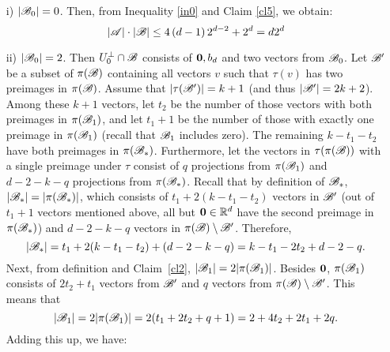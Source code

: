 \begin{enumerate}
\begin{enumerate}
            \begin{enumerate}
                \item[i)] $\left|{\mathscr{B}}_0\right|=0$. Then, from Inequality \ref{in0} and Claim \ref{cl5}, we obtain:
                \begin{equation*}
                    \left|{\mathscr{A}}\right|\cdot\left|{\mathscr{B}}\right|\leq4\left(d-1\right)2^{d-2}+2^d=d 2^d
                \end{equation*}
                \item[ii)] $\left|{\mathscr{B}}_0\right|=2$. Then $U_0^{\bot} \cap {\mathscr{B}}$ consists of $\mathbf{0}, b_d$ and two vectors from ${\mathscr{B}}_0$. Let ${\mathscr{B}}'$ be a subset of $\pi({\mathscr{B}})$ containing all vectors $v$ such that $\tau(v)$ has two preimages in $\pi({\mathscr{B}})$. Assume that $|\tau({\mathscr{B}}')|=k+1$ (and thus $|{\mathscr{B}}'| = 2k+2$).
                Among these $k+1$ vectors, let $t_2$ be the number of those vectors with both preimages in $\pi({\mathscr{B}}_1)$, and let $t_1+1$ be the number of those with exactly one preimage in $\pi({\mathscr{B}}_1)$ (recall that ${\mathscr{B}}_1$ includes zero). The remaining $k-t_1-t_2$ have both preimages in $\pi({\mathscr{B}}_*)$. Furthermore, let the vectors in $\tau(\pi({\mathscr{B}}))$ with a single preimage under $\tau$ consist of $q$ projections from $\pi({\mathscr{B}}_1)$ and $d-2-k-q$ projections from $\pi({\mathscr{B}}_*)$. Recall that by definition of ${\mathscr{B}}_*$, $|{\mathscr{B}}_*| = |\pi({\mathscr{B}}_*)|$, which consists of $t_1 + 2(k-t_1-t_2)$ vectors in ${\mathscr{B}}'$ (out of $t_1 + 1$ vectors mentioned above, all but $\mathbf{0}\in{\mathbb{R}}^d$ have the second preimage in $\pi({\mathscr{B}}_*)$) and $d-2-k-q$ vectors in $\pi({\mathscr{B}})\setminus {\mathscr{B}}'$. Therefore, 
                \[
                    |{\mathscr{B}}_*| = t_1 + 2(k-t_1-t_2) + (d-2-k-q) = k - t_1 - 2t_2 + d - 2 - q.
                \]
                Next, from definition and Claim~\ref{cl2}, $|{\mathscr{B}}_1|=2|\pi({\mathscr{B}}_1)|$. Besides $\mathbf{0}$, $\pi({\mathscr{B}}_1)$ consists of $2t_2+t_1$ vectors from ${\mathscr{B}}'$ and $q$ vectors from $\pi({\mathscr{B}})\setminus {\mathscr{B}}'$. This means that
                \[
                    |{\mathscr{B}}_1| = 2|\pi({\mathscr{B}}_1)| = 2(t_1 + 2t_2 + q + 1) = 2 + 4t_2 + 2t_1 + 2q.
                \]
                Adding this up, we have:
                 

\end{enumerate}
\end{enumerate}
\end{enumerate}
